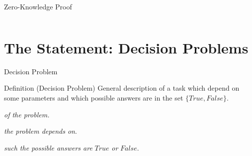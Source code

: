 \documentclass{beamer}
\begin{document}
\begin{frame}[t]{Zero-Knowledge Proof}
\begin{columns}
\begin{column}{0.3\textwidth}
		\end{column}
	\end{columns}
\end{frame}

\section{The Statement: Decision Problems}

\begin{frame}{Decision Problem}
	\begin{block}{Definition (Decision Problem)}
		General description of a task which depend on some parameters and which possible answers are in the set $\{True, False \}$.
	\end{block}
	\begin{description}[Parameters]
		\item[Name] \textit{of the problem.}
		\item[Parameters] \textit{the problem depends on}.
		\item[Question] \textit{such the possible answers are} $True$ \textit{or} $False$.
	\end{description}
\end{frame}
\end{document}
